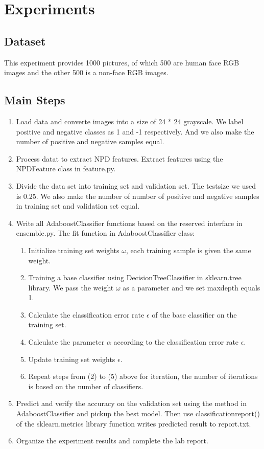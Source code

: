 \documentclass[journal, a4paper]{IEEEtran}
\begin{document}
\section{Experiments}
\subsection{Dataset}
This experiment provides 1000 pictures, of which 500 are human face RGB images and the other 500 is a non-face RGB images. 

\subsection{Main Steps}

    \begin{enumerate}[1.]
        \item Load data and converte images into a size of 24 * 24 grayscale. We label positive and negative classes as 1 and -1 respectively. And we also make the number of positive and negative samples equal.
        \item Process datat to extract NPD features. Extract features using the NPDFeature class in feature.py. 
        \item Divide the data set into training set and validation set. The test\textunderscore size we used is 0.25. We also make the number of number of positive and negative samples in training set and validation set equal.
        \item Write all AdaboostClassifier functions based on the reserved interface in ensemble.py. The fit function in AdaboostClassifier class:
        \begin{enumerate}[(1)]
            \item Initialize training set weights $\omega$, each training sample is given the same weight. 
            \item Training a base classifier using DecisionTreeClassifier in sklearn.tree library. We pass the weight $\omega$ as a parameter and we set max\textunderscore depth equals 1.
            \item Calculate the classification error rate $\epsilon$ of the base classifier on the training set. 
            \item Calculate the parameter $\alpha$ according to the classification error rate $\epsilon$.
            \item Update training set weights $\epsilon$.
            \item Repeat steps from (2) to (5) above for iteration, the number of iterations is based on the number of classifiers.
        \end{enumerate}
        \item Predict and verify the accuracy on the validation set using the method in AdaboostClassifier and pickup the best model. Then use classification\textunderscore report() of the sklearn.metrics library function writes predicted result to report.txt.
        \item Organize the experiment results and complete the lab report.
    \end{enumerate}
\end{document}
